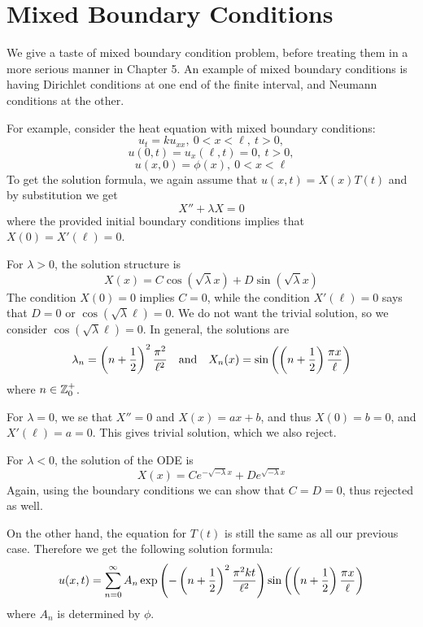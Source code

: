 \section{Mixed Boundary Conditions}

We give a taste of mixed boundary condition problem, before treating them in a more serious manner in Chapter 5. An example of mixed boundary conditions is having Dirichlet conditions at one end of the finite interval, and Neumann conditions at the other. 

For example, consider the heat equation with mixed boundary conditions:
\[u_t= ku_{xx},\ 0<x<\ell,\ t>0,\]
\[u(0,t) = u_x(\ell, t) = 0,\ t>0,\]
\[u(x,0)=\phi(x),\ 0<x<\ell\]
To get the solution formula, we again assume that $u(x,t)=X(x)T(t)$ and by substitution we get 
\[X'' + \lambda X = 0\]
where the provided initial boundary conditions implies that $X(0) = X'(\ell)=0$. 

For $\lambda>0$, the solution structure is 
\[X(x) = C\cos (\sqrt{\lambda}x) + D\sin (\sqrt\lambda x)\]
The condition $X(0)=0$ implies $C=0$, while the condition $X'(\ell) = 0$ says that $D=0$ or $\cos(\sqrt{\lambda}\ell)=0$. We do not want the trivial solution, so we consider $\cos(\sqrt{\lambda}\ell)=0$. In general, the solutions are 
\[\lambda_n  = \left(n+\frac{1}{2}\right)^2 \frac{\pi^2}{\ell^2} \quad \text{and} \quad X_n(x) = \sin \left(\left(n+\frac{1}{2}\right)\frac{\pi x}{\ell}\right)\]
where $n\in {\mathbb Z}^+_0$.

For $\lambda=0$, we se that $X''=0$ and $X(x)=ax+b$, and thus $X(0)=b=0$, and $X'(\ell) = a=0$. This gives trivial solution, which we also reject.

For $\lambda<0$, the solution of the ODE is 
\[X(x) = Ce^{-\sqrt{-\lambda}x} + D e^{\sqrt{-\lambda}x}\]
Again, using the boundary conditions we can show that $C=D=0$, thus rejected as well.

On the other hand, the equation for $T(t)$ is still the same as all our previous case. Therefore we get the following solution formula:
\[u(x,t) = \sum_{n=0}^{\infty}A_n \exp\left(-\left(n+\frac{1}{2}\right)^2 \frac{\pi^2kt}{\ell^2}\right)\sin\left(\left(n+\frac{1}{2}\right)\frac{\pi x}{\ell}\right)\]
where $A_n$ is determined by $\phi$.